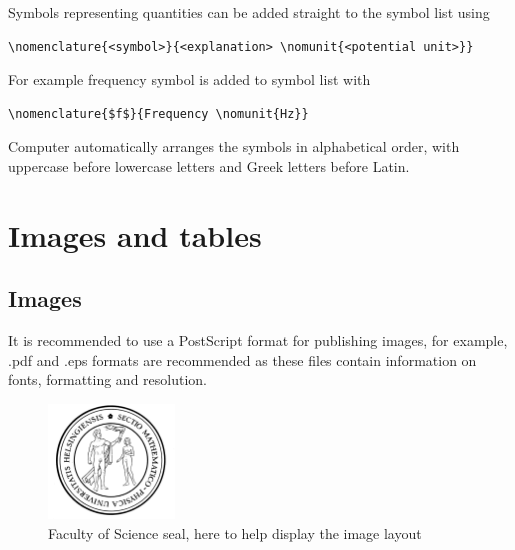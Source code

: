 \documentclass[english,twoside,openright]{HYgradu}
\begin{document}
Symbols representing quantities can be added straight to the symbol
list using
\begin{verbatim}
\nomenclature{<symbol>}{<explanation> \nomunit{<potential unit>}}
\end{verbatim}
For example frequency symbol is added to symbol list with
\begin{verbatim}
\nomenclature{$f$}{Frequency \nomunit{Hz}}
\end{verbatim}
Computer automatically arranges the symbols in alphabetical order,
with uppercase before lowercase letters and Greek letters before
Latin.

\begin{center}
\end{center}

\chapter{Images and tables}

\section{Images}

It is recommended to use a PostScript format for publishing images,
for example, .pdf and .eps formats are recommended as these files
contain information on fonts, formatting and resolution.

\begin{figure}[h!] 
\centering %
\includegraphics[width=0.3\textwidth]{sinetti.png}
\caption{Faculty of Science seal, here to help display the image layout}
\label{fig:sinetti}
\end{figure}
\end{document}
